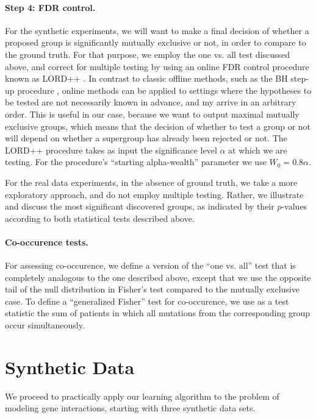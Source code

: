 \paragraph{Step 4: FDR control.}
For the synthetic experiments, we will want to make a final decision of whether a proposed group is significantly mutually exclusive or not, in order to compare to the ground truth.
For that purpose, we employ the one vs. all test discussed above, and correct for multiple testing by using an online FDR control procedure known as LORD++ \citep{lordpp,lord}.
In contrast to classic offline methods, such as the BH step-up procedure \citep{bh}, online methods can be applied to settings where the hypotheses to be tested are not necessarily known in advance, and my arrive in an arbitrary order.
This is useful in our case, because we want to output maximal mutually exclusive groups, which means that the decision of whether to test a group or not will depend on whether a supergroup has already been rejected or not.
The LORD++ procedure takes as input the significance level $\alpha$ at which we are testing.
For the procedure's ``starting alpha-wealth'' parameter we use $W_0 = 0.8\alpha$.

For the real data experiments, in the absence of ground truth, we take a more exploratory approach, and do not employ multiple testing.
Rather, we illustrate and discuss the most significant discovered groups, as indicated by their $p$-values according to both statistical tests described above.

\paragraph{Co-occurence tests.}
For assessing co-occurence, we define a version of the ``one vs. all'' test that is completely analogous to the one described above, except that we use the opposite tail of the null distribution in Fisher's test compared to the mutually exclusive case.
To define a ``generalized Fisher'' test for co-occurence, we use as a test statistic the sum of patients in which all mutations from the corresponding group occur simultaneously.


\section{Synthetic Data}
We proceed to practically apply our learning algorithm to the problem of modeling gene interactions, starting with three synthetic data sets.

